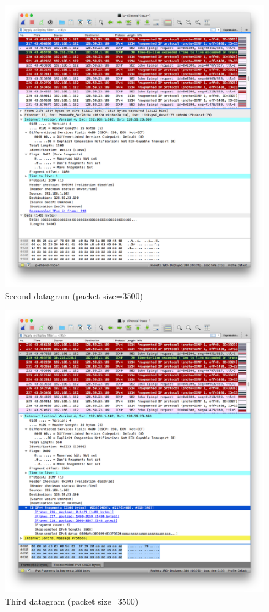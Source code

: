 \documentclass[11pt]{article}
\begin{document}
\begin{itemize}
		\begin{figure}[H]
		\centering
		\caption{Second datagram (packet size=3500)}
		\includegraphics[width=\textwidth]{05}
		\end{figure}
		
		\begin{figure}[H]
		\centering
		\caption{Third datagram (packet size=3500)}
		\includegraphics[width=\textwidth]{06}
		\end{figure}

\end{itemize}
\end{document}
